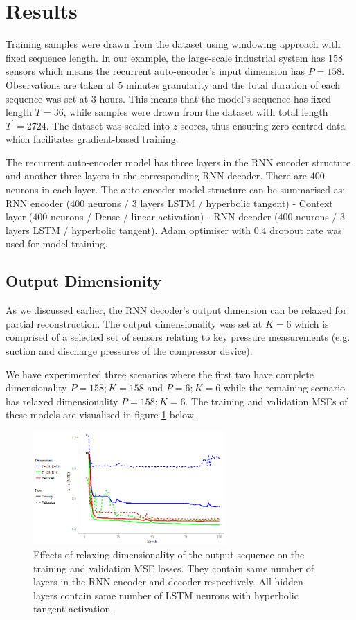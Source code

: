 \documentclass[runningheads]{llncs}
\begin{document}
\section{Results}

Training samples were drawn from the dataset using windowing approach with fixed sequence length. In our example, the large-scale industrial system has \(158\) sensors which means the recurrent auto-encoder's input dimension has \(P=158\). Observations are taken at \(5\) minutes granularity and the total duration of each sequence was set at \(3\) hours. This means that the model's sequence has fixed length \(T=36\), while samples were drawn from the dataset with total length \(T^\prime=2724\). The dataset was scaled into \(z\)-scores, thus ensuring zero-centred data which facilitates gradient-based training.

The recurrent auto-encoder model has three layers in the RNN encoder structure and another three layers in the corresponding RNN decoder. There are \(400\) neurons in each layer. The auto-encoder model structure can be summarised as: RNN encoder (\(400\) neurons / \(3\) layers LSTM / hyperbolic tangent) - Context layer (\(400\) neurons / Dense / linear activation) - RNN decoder (\(400\) neurons / \(3\) layers LSTM / hyperbolic tangent). Adam optimiser \cite{kingma} with \(0.4\) dropout rate was used for model training.

\subsection{Output Dimensionity}

As we discussed earlier, the RNN decoder's output dimension can be relaxed for partial reconstruction. The output dimensionality was set at \(K=6\) which is comprised of a selected set of sensors relating to key pressure measurements (e.g. suction and discharge pressures of the compressor device).

We have experimented three scenarios where the first two have complete dimensionality \(P=158; K=158\) and \(P=6; K=6\) while the remaining scenario has relaxed dimensionality \(P=158; K=6\). The training and validation MSEs of these models are visualised in figure \ref{fig:output_dims} below.

\begin{figure}[h]
	\centering
	\includegraphics[width=0.65\textwidth]{output_dims.PNG}
	\caption{Effects of relaxing dimensionality of the output sequence on the training and validation MSE losses. They contain same number of layers in the RNN encoder and decoder respectively. All hidden layers contain same number of LSTM neurons with hyperbolic tangent activation.}
	\label{fig:output_dims}
\end{figure}
\end{document}
